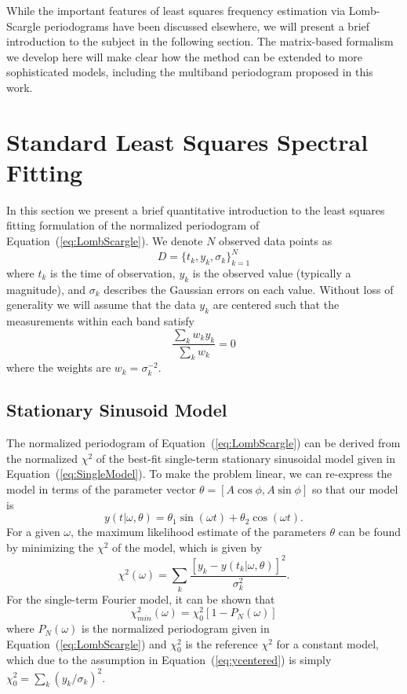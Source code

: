 \documentclass{emulateapj}
\newcommand{\Eq}[1]{Equation~(\ref{eq:#1})}
\newcommand{\eq}[1]{\Eq{#1}}
\newcommand{\eqlabel}[1]{\label{eq:#1}}
\newcommand{\sectlabel}[1]{\label{sect:#1}}
\begin{document}
While the important features of least squares frequency estimation via Lomb-Scargle periodograms have been discussed elsewhere, we will present a brief introduction to the subject in the following section.
The matrix-based formalism we develop here will make clear how the method can be extended to more sophisticated models, including the multiband periodogram proposed in this work.


\section{Standard Least Squares Spectral Fitting}
\sectlabel{matrix_formalism}

In this section we present a brief quantitative introduction to the least squares fitting formulation of the normalized periodogram of \eq{LombScargle}. We denote $N$ observed data points as
\begin{equation}
  D = \{t_k, y_k, \sigma_k\}_{k=1}^N
\end{equation}
where $t_k$ is the time of observation, $y_k$ is the observed value (typically a magnitude), and $\sigma_k$ describes the Gaussian errors on each value. Without loss of generality we will assume that the data $y_k$ are centered such that the measurements within each band satisfy
\begin{equation}
  \eqlabel{ycentered}
  \frac{\sum_k w_ky_k}{\sum_k w_k} = 0
\end{equation}
where the weights are $w_k = \sigma_k^{-2}$.

\subsection{Stationary Sinusoid Model}

The normalized periodogram of \eq{LombScargle} can be derived from the normalized $\chi^2$ of the best-fit single-term stationary sinusoidal model given in \eq{SingleModel}. To make the problem linear, we can re-express the model in terms of the parameter vector $\theta = [A\cos\phi, A\sin\phi]$ so that our model is
\begin{equation}
  \eqlabel{simplemodel}
  y(t|\omega,\theta) = \theta_1\sin(\omega t) + \theta_2\cos(\omega t).
\end{equation}
For a given $\omega$, the maximum likelihood estimate of the parameters $\theta$ can be found by minimizing the $\chi^2$ of the model, which is given by
\begin{equation}
  \chi^2(\omega) = \sum_k \frac{[y_k - y(t_k|\omega,\theta)]^2}{\sigma_k^2}.
\end{equation}
For the single-term Fourier model, it can be shown \citep[see, e.g.][]{ICVG2014} that
\begin{equation}
  \eqlabel{chi2PN}
  \chi_{min}^2(\omega) = \chi^2_0[1 - P_N(\omega)]
\end{equation}
where $P_N(\omega)$ is the normalized periodogram given in \eq{LombScargle} and $\chi^2_0$ is the reference $\chi^2$ for a constant model, which due to the assumption in \eq{ycentered} is simply $\chi^2_0 = \sum_k (y_k/\sigma_k)^2$.
\end{document}
